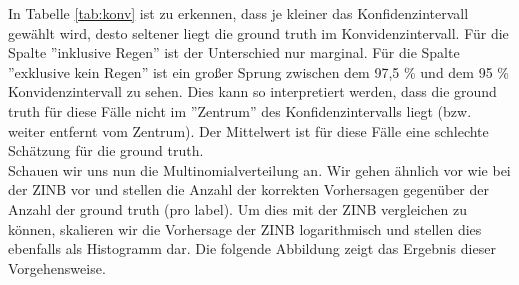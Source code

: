 \noindent In Tabelle \ref{tab:konv} ist zu erkennen, dass je kleiner das Konfidenzintervall gewählt wird, desto seltener liegt die ground truth im Konvidenzintervall.
Für die Spalte ''inklusive Regen'' ist der Unterschied nur marginal. Für die Spalte ''exklusive kein Regen'' ist ein großer Sprung zwischen dem 97,5 \% und dem 95 \% Konvidenzintervall zu sehen.
Dies kann so interpretiert werden, dass die ground truth für diese Fälle nicht im ''Zentrum'' des Konfidenzintervalls liegt (bzw. weiter entfernt vom Zentrum). Der Mittelwert ist für diese Fälle eine schlechte Schätzung für die ground truth.\\

\noindent Schauen wir uns nun die Multinomialverteilung an. Wir gehen ähnlich vor wie bei der ZINB vor und stellen die Anzahl der korrekten Vorhersagen gegenüber der Anzahl der ground truth (pro label). Um dies mit der ZINB vergleichen zu können, skalieren wir die Vorhersage der ZINB logarithmisch und stellen dies ebenfalls als Histogramm dar. Die folgende Abbildung zeigt das Ergebnis dieser Vorgehensweise.\\

